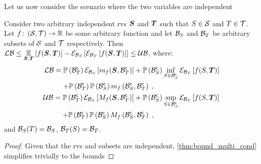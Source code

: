 Let us now consider the scenario where the two variables are independent
\begin{proposition}
	\label{thm:bound_multi_ind}
	Consider two arbitrary independent \glspl{rv} $\RV$ and $\RVI$ such that $\variable\in\Space$ and $\variableI\in\SpaceI$. Let $f\colon\left(\Space,\SpaceI\right)\to\R$ be some arbitrary function and let $\subSpaceI{\variable}$ and $\subSpaceI{\variableI}$ be arbitrary subsets of $\Space$ and $\SpaceI$ respectively. Then $\lowerbound\leq\expectation{f(\RV,\RVI)}{\RV,\RVI}-\partialexpectation{\partialexpectation{f(\RV,\RVI)}{\subSpaceI{\variableI}}}{\subSpaceI{\variable}}\leq\upperbound$, where:
	\begin{subequations}
		\begin{align}
			\begin{split}
				\lowerbound & = \measure{\stcompI{\subSpace}{\variableI}}\partialexpectation{m_f(\RV,\stcompI{\subSpace}{\variableI})}{\subSpaceI{\variable}}
				+\measure{\stcompI{\subSpace}{\variable}}\inf_{\variable\in\stcompI{\subSpace}{\variable}}\partialexpectation{f(\variable,\RVI)}{\subSpaceI{\variableI}}\\
				&\phantomeq+\measure{\stcompI{\subSpace}{\variableI}}\measure{\stcompI{\subSpace}{\variable}}m_f\left(\stcompI{\subSpace}{\variable},\stcompI{\subSpace}{\variableI}\right)\;,
			\end{split}
			\\
			\begin{split}
				\upperbound & = \measure{\stcompI{\subSpace}{\variableI}}\partialexpectation{M_f(\RV,\stcompI{\subSpace}{\variableI})}{\subSpaceI{\variable}}
				+\measure{\stcompI{\subSpace}{\variable}}\sup_{\variable\in\stcompI{\subSpace}{\variable}}\partialexpectation{f(\variable,\RVI)}{\subSpaceI{\variableI}}\\
				&\phantomeq+\measure{\stcompI{\subSpace}{\variableI}}\measure{\stcompI{\subSpace}{\variable}}M_f\left(\stcompI{\subSpace}{\variable},\stcompI{\subSpace}{\variableI}\right)\;,
			\end{split}
		\end{align}
	\end{subequations}
	and $\subSpaceI{\variable}(\variableI)=\subSpaceI{\variable}$, $\subSpaceI{\variableI}(\variable)=\subSpaceI{\variableI}$.
\end{proposition}
\begin{proof}
	Given that the \glspl{rv} and subsets are independent, \autoref{thm:bound_multi_cond} simplifies trivially to the bounds
\end{proof}

